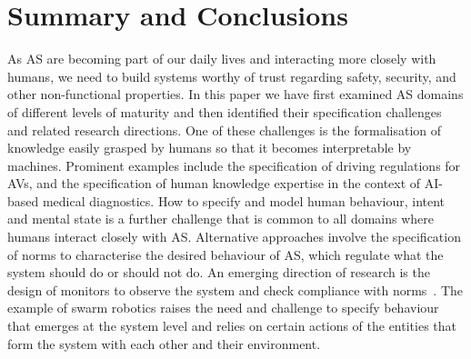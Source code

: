 \documentclass[sigconf,nonacm]{acmart}%
\begin{document}
	
	
	
	
	\section{Summary and Conclusions}\label{conclusions}	
	As AS are becoming part of our daily lives and interacting more closely with humans, we need to build systems worthy of trust regarding safety, security, and other non-functional properties. In this paper we have first examined AS domains of different levels of maturity and then identified their specification challenges and related research directions. 
	One of these challenges is the formalisation of knowledge easily grasped by humans so that it becomes interpretable by machines. Prominent examples include the specification of driving regulations for AVs, and the specification of human knowledge expertise in the context of AI-based medical diagnostics. 
	How to specify and model human behaviour, intent and mental state is a further challenge that is common to all domains where humans interact closely with AS.
	Alternative approaches involve the specification of norms to characterise the desired behaviour of AS, which regulate what the system should do or should not do. An emerging direction of research is the design of monitors to observe the system and check compliance with norms~\cite{Criado:2018}. 
	The example of swarm robotics raises the need and challenge to specify behaviour that emerges at the system level and relies on certain actions of the entities that form the system with each other and their environment. 
	
\end{document}
